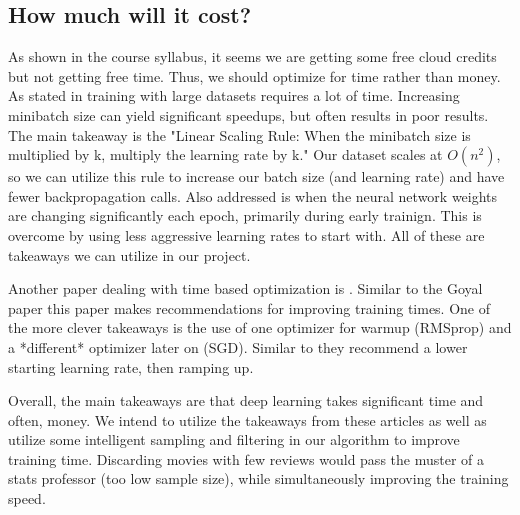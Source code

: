 \subsection{How much will it cost?}

As shown in the course syllabus, it seems we are getting some free cloud credits but not getting free time. Thus, we should optimize for time rather than money. As stated in \cite{Goyal2017} training with large datasets requires a lot of time. Increasing minibatch size can yield significant speedups, but often results in poor results. The main takeaway is the "Linear Scaling Rule: When the minibatch size is multiplied by k, multiply the learning rate by k." Our dataset scales at $O(n^2)$, so we can utilize this rule to increase our batch size (and learning rate) and have fewer backpropagation calls. Also addressed is when the neural network weights are changing significantly each epoch, primarily during early trainign. This is overcome by using less aggressive learning rates to start with. All of these are takeaways we can utilize in our project.

Another paper dealing with time based optimization is \cite{Akiba2017}. Similar to the Goyal paper this paper makes recommendations for improving training times. One of the more clever takeaways is the use of one optimizer for warmup (RMSprop) and a *different* optimizer later on (SGD). Similar to \cite{Goyal2017} they recommend a lower starting learning rate, then ramping up.

Overall, the main takeaways are that deep learning takes significant time and often, money. We intend to utilize the takeaways from these articles as well as utilize some intelligent sampling and filtering in our algorithm to improve training time. Discarding movies with few reviews would pass the muster of a stats professor (too low sample size), while simultaneously improving the training speed.
